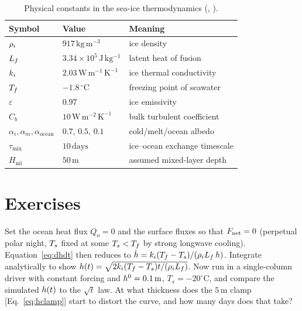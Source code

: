\begin{table}[t]
\centering
\caption{Physical constants in the \model{} sea-ice thermodynamics
(, ).}
\begin{tabular}{lll}
\toprule
Symbol & Value & Meaning \\
\midrule
$\rho_{i}$            & $917\,\mathrm{kg\,m^{-3}}$              & ice density \\
$L_{f}$                & $3.34\times10^{5}\,\mathrm{J\,kg^{-1}}$ & latent heat of fusion \\
$k_{i}$              & $2.03\,\mathrm{W\,m^{-1}\,K^{-1}}$      & ice thermal conductivity \\
$T_{f}$               & $-1.8\,^\circ\mathrm{C}$                & freezing point of seawater \\
$\varepsilon$        & $0.97$                                  & ice emissivity \\
$C_b$                & $10\,\mathrm{W\,m^{-2}\,K^{-1}}$        & bulk turbulent coefficient \\
$\alpha_i,\alpha_m,\alpha_{\mathrm{ocean}}$ & $0.7,\,0.5,\,0.1$ & cold/melt/ocean albedo \\
$\tau_{\mathrm{mix}}$ & $10\,\mathrm{days}$                    & ice--ocean exchange timescale \\
$H_{\mathrm{ml}}$    & $50\,\mathrm{m}$                        & assumed mixed-layer depth \\
\bottomrule
\end{tabular}
\end{table}

\section*{Exercises}

\begin{exercise}
Set the ocean heat flux $Q_o=0$ and the surface fluxes so that $F_{\mathrm{net}}=0$
(perpetual polar night, $T_{s}$ fixed at some $T_s<T_{f}$ by strong longwave
cooling). Equation~\eqref{eq:dhdt} then reduces to
$\dot{h}=k_{i}(T_{f}-T_s)/(\rho_{i}L_{f}\,h)$. Integrate analytically to show
$h(t)=\sqrt{2k_{i}(T_{f}-T_s)t/(\rho_{i}L_{f})}$. Now run  in a
single-column driver with constant forcing and $h^0=0.1\,\mathrm{m}$,
$T_s=-20^\circ\mathrm{C}$, and compare the simulated $h(t)$ to the
$\sqrt{t}$ law. At what thickness does the $5\,\mathrm{m}$ clamp
[Eq.~\eqref{eq:hclamp}] start to distort the curve, and how many days does that
take?
\end{exercise}

